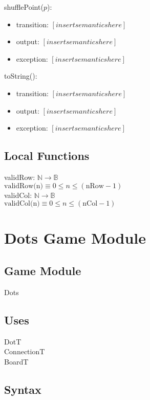 \documentclass[12pt]{article}
\begin{document}
\noindent shufflePoint($p$):
\begin{itemize}
    \item transition: $[insert semantics here]$
    \item output: $[insert semantics here]$
    \item exception: $[insert semantics here]$
\end{itemize}

\noindent toString():
\begin{itemize}
    \item transition: $[insert semantics here]$
    \item output: $[insert semantics here]$
    \item exception: $[insert semantics here]$
\end{itemize}


\subsection*{Local Functions}
validRow: $\mathbb{N} \rightarrow \mathbb{B}$\\
$\mbox{validRow(n)} \equiv 0 \leq n \leq (\mbox{nRow} - 1)$\\

validCol: $\mathbb{N} \rightarrow \mathbb{B}$\\
$\mbox{validCol(n)} \equiv 0 \leq n \leq (\mbox{nCol} - 1)$\\



\newpage
\section* {Dots Game Module}
\subsection*{Game Module}
Dots


\subsection* {Uses}
DotT \\
ConnectionT \\
BoardT


\subsection* {Syntax}
\end{document}
